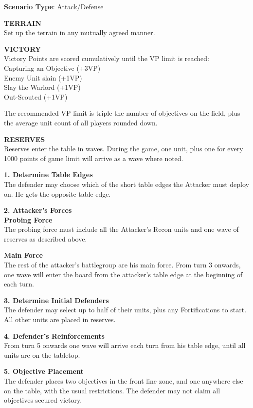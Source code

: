 \documentclass[letterpaper,twocolumn,oneside,titlepage]{book}
\begin{document}
\textbf{Scenario Type}: Attack/Defense

\textbf{TERRAIN}\\
Set up the terrain in any mutually agreed manner.

\textbf{VICTORY}\\
Victory Points are scored cumulatively until the VP limit is reached:\\
Capturing an Objective (+3VP)\\
Enemy Unit slain (+1VP)\\
Slay the Warlord (+1VP)\\
Out-Scouted (+1VP)

The recommended VP limit is triple the number of objectives on the
field, plus the average unit count of all players rounded down.

\textbf{RESERVES}\\
Reserves enter the table in waves. During the game, one unit, plus one
for every 1000 points of game limit will arrive as a wave where noted.

\textbf{1. Determine Table Edges}\\
The defender may choose which of the short table edges the Attacker must
deploy on. He gets the opposite table edge.

\textbf{2. Attacker's Forces}\\
\textbf{Probing Force}\\
The probing force must include all the Attacker's Recon units and one
wave of reserves as described above.

\textbf{Main Force}\\
The rest of the attacker's battlegroup are his main force. From turn 3
onwards, one wave will enter the board from the attacker's table edge at
the beginning of each turn.

\textbf{3. Determine Initial Defenders}\\
The defender may select up to half of their units, plus any
Fortifications to start. All other units are placed in reserves.

\textbf{4. Defender's Reinforcements}\\
From turn 5 onwards one wave will arrive each turn from his table edge,
until all units are on the tabletop.

\textbf{5. Objective Placement}\\
The defender places two objectives in the front line zone, and one
anywhere else on the table, with the usual restrictions. The defender
may not claim all objectives secured victory.
\end{document}
